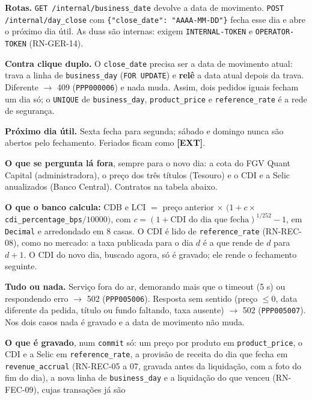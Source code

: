 \documentclass[11pt,a4paper]{article}
\newcommand{\fundo}{FGV Quant Capital}     %
\newcommand{\obr}{\textbf{[OBR]}}          %
\newcommand{\dec}{\textbf{[DEC]}}          %
\newcommand{\ext}{\textbf{[EXT]}}          %
\newcommand{\tb}[1]{\texttt{#1}}           %
\begin{document}
\begin{regras}
  \item[RN-FEC-01 \dec] \textbf{Rotas.} \tb{GET /internal/business_date} devolve a data de
  movimento. \tb{POST /internal/day_close} com \tb{\{"close_date": "AAAA-MM-DD"\}} fecha esse dia e
  abre o próximo dia útil. As duas são internas: exigem \tb{INTERNAL-TOKEN} e \tb{OPERATOR-TOKEN}
  (RN-GER-14).
  \item[RN-FEC-02 \dec] \textbf{Contra clique duplo.} O \tb{close_date} precisa ser a data de
  movimento atual: trava a linha de \tb{business_day} (\tb{FOR UPDATE}) e \textbf{relê} a data
  atual depois da trava. Diferente $\to$ 409 (\tb{PPP000006}) e nada muda. Assim, dois pedidos
  iguais fecham um dia só; o \tb{UNIQUE} de \tb{business_day}, \tb{product_price} e
  \tb{reference_rate} é a rede de segurança.
  \item[RN-FEC-03 \dec] \textbf{Próximo dia útil.} Sexta fecha para segunda; sábado e domingo nunca
  são abertos pelo fechamento. Feriados ficam como \ext.
  \item[RN-FEC-04 \dec] \textbf{O que se pergunta lá fora}, sempre para o novo dia: a cota do
  \fundo{} (administradora), o preço dos três títulos (Tesouro) e o CDI e a Selic anualizados
  (Banco Central). Contratos na tabela abaixo.
  \item[RN-FEC-05 \dec] \textbf{O que o banco calcula:} CDB e LCI $=$ preço anterior $\times$
  $(1 + c \times$ \tb{cdi_percentage_bps}$/10000)$, com $c = (1 + \text{CDI do dia que
  fecha})^{1/252} - 1$, em \tb{Decimal} e arredondado em 8 casas. O CDI é lido de
  \tb{reference_rate} (RN-REC-08), como no mercado: a taxa publicada para o dia $d$ é a que rende
  de $d$ para $d+1$. O CDI do novo dia, buscado agora, só é gravado; ele rende o fechamento
  seguinte.
  \item[RN-FEC-06 \obr] \textbf{Tudo ou nada.} Serviço fora do ar, demorando mais que o timeout (5 s)
  ou respondendo erro $\to$ 502 (\tb{PPP005006}). Resposta sem sentido (preço $\le 0$, data
  diferente da pedida, título ou fundo faltando, taxa ausente) $\to$ 502 (\tb{PPP005007}). Nos dois
  casos nada é gravado e a data de movimento não muda.
  \item[RN-FEC-07 \dec] \textbf{O que é gravado}, num \tb{commit} só: um preço por produto em
  \tb{product_price}, o CDI e a Selic em \tb{reference_rate}, a provisão de receita do dia que fecha
  em \tb{revenue_accrual} (RN-REC-05 a 07, gravada antes da liquidação, com a foto do fim do dia), a
  nova linha de \tb{business_day} e a liquidação do que venceu (RN-FEC-09), cujas transações já são

\end{regras}
\end{document}

